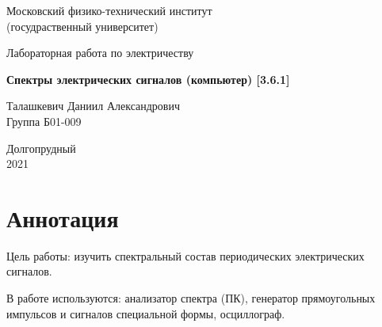 \documentclass[a4paper, 12pt]{article}%
\begin{document}


\begin{titlepage}

	\newpage
	\begin{center}
		\normalsize Московский физико-технический институт \\(госудраственный 			университет)
	\end{center}

	\vspace{6em}

	\begin{center}
		\Large Лабораторная работа по электричеству\\
	\end{center}

	\vspace{1em}

	\begin{center}
		\large \textbf{Спектры электрических сигналов (компьютер) [3.6.1]}
	\end{center}

	\vspace{2em}

	\begin{center}
		\large Талашкевич Даниил Александрович\\
		Группа Б01-009
	\end{center}

	\vspace{\fill}

	\begin{center}
	Долгопрудный \\2021
	\end{center}
	
\end{titlepage}



	\thispagestyle{empty}
	\newpage
	\tableofcontents
	\newpage
	\setcounter{page}{1}



\section{Аннотация}

$\textbf{Цель работы}$: изучить спектральный состав периодических электрических сигналов.

$\textbf{В работе используются}$: анализатор спектра (ПК), генератор прямоугольных импульсов и сигналов специальной формы, осциллограф.
\end{document}
